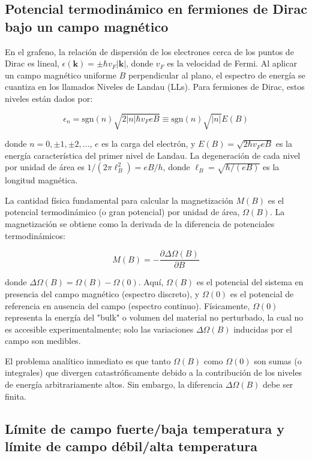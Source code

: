 \subsection{Potencial termodinámico en fermiones de Dirac bajo un campo magnético}

En el grafeno, la relación de dispersión de los electrones cerca de los puntos de Dirac es lineal, $\epsilon(\mathbf{k}) = \pm \hbar v_F |\mathbf{k}|$, donde $v_F$ es la velocidad de Fermi. Al aplicar un campo magnético uniforme $B$ perpendicular al plano, el espectro de energía se cuantiza en los llamados Niveles de Landau (LLs). Para fermiones de Dirac, estos niveles están dados por:

$$ \epsilon_n = \text{sgn}(n)\sqrt{2|n|\hbar v_F e B} \equiv \text{sgn}(n)\sqrt{|n|}E(B) $$

donde $n = 0, \pm 1, \pm 2, \dots$, $e$ es la carga del electrón, y $E(B) = \sqrt{2\hbar v_F e B}$ es la energía característica del primer nivel de Landau. La degeneración de cada nivel por unidad de área es $1/(2\pi \ell_B^2) = eB/h$, donde $\ell_B = \sqrt{\hbar/(eB)}$ es la longitud magnética.

La cantidad física fundamental para calcular la magnetización $M(B)$ es el potencial termodinámico (o gran potencial) por unidad de área, $\Omega(B)$. La magnetización se obtiene como la derivada de la diferencia de potenciales termodinámicos:

$$ M(B) = -\frac{\partial \Delta\Omega(B)}{\partial B} $$

donde $\Delta\Omega(B) = \Omega(B) - \Omega(0)$. Aquí, $\Omega(B)$ es el potencial del sistema en presencia del campo magnético (espectro discreto), y $\Omega(0)$ es el potencial de referencia en ausencia del campo (espectro continuo). Físicamente, $\Omega(0)$ representa la energía del "bulk" o volumen del material no perturbado, la cual no es accesible experimentalmente; solo las variaciones $\Delta\Omega(B)$ inducidas por el campo son medibles.

El problema analítico inmediato es que tanto $\Omega(B)$ como $\Omega(0)$ son sumas (o integrales) que divergen catastróficamente debido a la contribución de los niveles de energía arbitrariamente altos. Sin embargo, la diferencia $\Delta\Omega(B)$ debe ser finita.

\subsection{Límite de campo fuerte/baja temperatura y límite de campo débil/alta temperatura}

